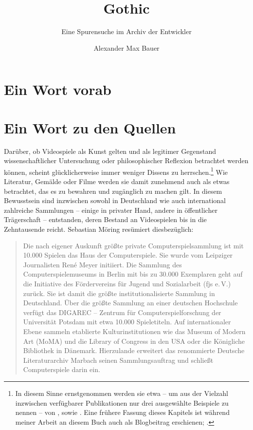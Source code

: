 \documentclass[a5paper,pagesize,numbers=noenddot]{scrbook}
\title{Gothic}
\subtitle{Eine Spurensuche im Archiv der Entwickler}
\author{Alexander Max Bauer}
\date{}
\begin{document}
\maketitle


\frontmatter
\tableofcontents


\mainmatter
\chapter{Ein Wort vorab}\label{ch:vorwort}


\chapter{Ein Wort zu den Quellen}\label{ch:quellen}
Darüber, ob Videospiele als Kunst gelten und als legitimer Gegenstand wissenschaftlicher Untersuchung oder philosophischer Reflexion betrachtet werden können, scheint glücklicherweise immer weniger Dissens zu herrschen.\footnote{In diesem Sinne ernstgenommen werden sie etwa -- um aus der Vielzahl inzwischen verfügbarer Publikationen nur drei ausgewählte Beispiele zu nennen -- von \autocite{feige_computerspiele_2015}, \autocite{zimmermann_gameskultur_2020} sowie \autocite{beil_game_2018}. Eine frühere Fassung dieses Kapitels ist während meiner Arbeit an diesem Buch auch als Blogbeitrag erschienen; \autocite[vgl.][]{bauer_sammeln_2025}.}
Wie Literatur, Gemälde oder Filme werden sie damit zunehmend auch als etwas betrachtet, das es zu bewahren und zugänglich zu machen gilt.
In diesem Bewusstsein sind inzwischen sowohl in Deutschland wie auch international zahlreiche Sammlungen -- einige in privater Hand, andere in öffentlicher Trägerschaft -- entstanden, deren Bestand an Videospielen bis in die Zehntausende reicht.
Sebastian Möring resümiert diesbezüglich:

\begin{quote}
   Die nach eigener Auskunft größte private Computerspielsammlung ist mit 10.000 Spielen das Haus der Computerspiele.
   Sie wurde vom Leipziger Journalisten René Meyer initiiert.
   Die Sammlung des Computerspielemuseums in Berlin mit bis zu 30.000 Exemplaren geht auf die Initiative des Fördervereins für Jugend und Sozialarbeit (fjs e.\,V.) zurück.
   Sie ist damit die größte institutionalisierte Sammlung in Deutschland.
   Über die größte Sammlung an einer deutschen Hochschule verfügt das DIGAREC -- Zentrum für Computerspielforschung der Universität Potsdam mit etwa 10.000 Spieletiteln.
   Auf internationaler Ebene sammeln etablierte Kulturinstitutionen wie das Museum of Modern Art (MoMA) und die Library of Congress in den USA oder die Königliche Bibliothek in Dänemark.
   Hierzulande erweitert das renommierte Deutsche Literaturarchiv Marbach seinen Sammlungsauftrag und schließt Computerspiele darin ein.\autocite[S.~120]{moering_kulturarchive_2020}
\end{quote}
\end{document}
